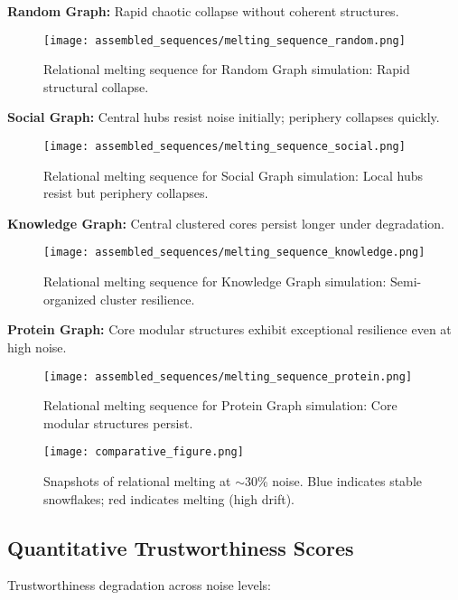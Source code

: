 \documentclass[conference]{IEEEtran}
\begin{document}
\textbf{Random Graph:} Rapid chaotic collapse without coherent structures.

\begin{figure*}[htbp]
\centerline{\texttt{[image: assembled\_sequences/melting\_sequence\_random.png]}}
\caption{Relational melting sequence for Random Graph simulation: Rapid structural collapse.}
\label{fig:random_melting}
\end{figure*}

\textbf{Social Graph:} Central hubs resist noise initially; periphery collapses quickly.

\begin{figure*}[htbp]
\centerline{\texttt{[image: assembled\_sequences/melting\_sequence\_social.png]}}
\caption{Relational melting sequence for Social Graph simulation: Local hubs resist but periphery collapses.}
\label{fig:social_melting}
\end{figure*}

\textbf{Knowledge Graph:} Central clustered cores persist longer under degradation.

\begin{figure*}[htbp]
\centering
\texttt{[image: assembled\_sequences/melting\_sequence\_knowledge.png]}
\caption{Relational melting sequence for Knowledge Graph simulation: Semi-organized cluster resilience.}
\label{fig:knowledge_melting}
\end{figure*}

\textbf{Protein Graph:} Core modular structures exhibit exceptional resilience even at high noise.

\begin{figure*}[htbp]
\centering
\texttt{[image: assembled\_sequences/melting\_sequence\_protein.png]}
\caption{Relational melting sequence for Protein Graph simulation: Core modular structures persist.}
\label{fig:protein_melting}
\end{figure*}

\begin{figure}[htbp]
\centerline{\texttt{[image: comparative\_figure.png]}}
\caption{Snapshots of relational melting at $\sim$30\% noise. Blue indicates stable snowflakes; red indicates melting (high drift).}
\label{fig:comparative}
\end{figure}

\subsection{Quantitative Trustworthiness Scores}
Trustworthiness degradation across noise levels:
\end{document}

